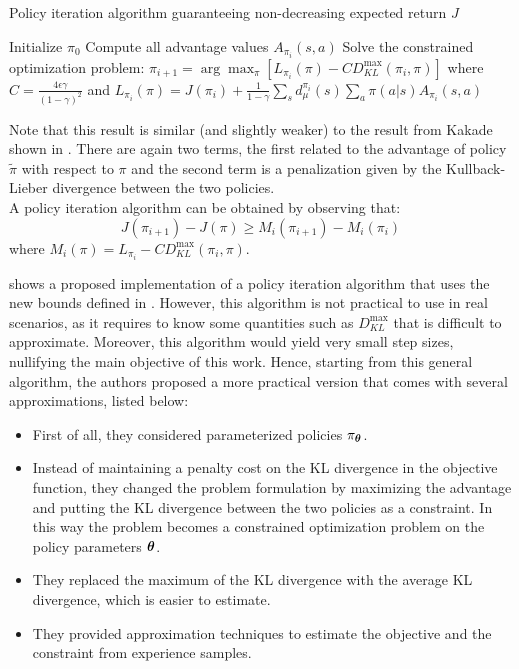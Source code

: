 \begin{algorithm}[!t]
\caption[PI algorithm guaranteeing non-decreasing expected return $J$.]{Policy iteration algorithm guaranteeing non-decreasing expected return $J$}
\label{alg:trpo-iteration}
\begin{algorithmic}
\State Initialize $\pi_0$
\State Compute all advantage values $A_{\pi_i}(s,a)$
\State Solve the constrained optimization problem:
\State $\pi_{i+1} = \arg\max_\pi \left[ L_{\pi_i}(\pi)-CD_{KL}^{\max}(\pi_i, \pi) \right]$
\State \qquad where $C = \frac{4\epsilon\gamma}{(1-\gamma)^2}$
\State \qquad and $L_{\pi_i}(\pi)=J(\pi_i) + \frac{1}{1-\gamma}\sum_s d_\mu^{\pi_i}(s)\sum_a\pi(a|s)A_{\pi_i}(s,a)$
\EndFor
\end{algorithmic}
\end{algorithm}

Note that this result is similar (and slightly weaker) to the result from Kakade shown in . There are again two terms, the first related to the advantage of policy $\tilde{\pi}$ with respect to $\pi$ and the second term is a penalization given by the Kullback-Lieber divergence between the two policies.\\
A policy iteration algorithm can be obtained by observing that:
\[
J(\pi_{i+1}) - J(\pi) \geq M_i(\pi_{i+1}) - M_i(\pi_i)
\]
where $M_i(\pi) = L_{\pi_i} - CD_{KL}^{\max}(\pi_i, \pi)$.

 shows a proposed implementation of a policy iteration algorithm that uses the new bounds defined in . However, this algorithm is not practical to use in real scenarios, as it requires to know some quantities such as $D_{KL}^{\max}$ that is difficult to approximate. Moreover, this algorithm would yield very small step sizes, nullifying the main objective of this work. Hence, starting from this general algorithm, the authors proposed a more practical version that comes with several approximations, listed below:
\begin{itemize}
\item First of all, they considered parameterized policies $\pi_{{\boldsymbol{\theta}}}$.
\item Instead of maintaining a penalty cost on the KL divergence in the objective function, they changed the problem formulation by maximizing the advantage and putting the KL divergence between the two policies as a constraint. In this way the problem becomes a constrained optimization problem on the policy parameters ${\boldsymbol{\theta}}$.
\item They replaced the maximum of the KL divergence with the average KL divergence, which is easier to estimate.
\item They provided approximation techniques to estimate the objective and the constraint from experience samples.
\end{itemize}

